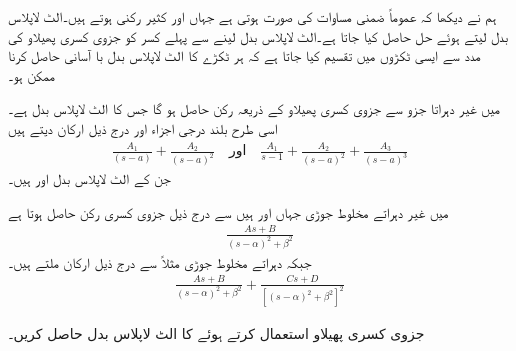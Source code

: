 ہم نے دیکھا کہ عموماً ضمنی مساوات کی صورت  ہوتی ہے جہاں  اور  کثیر رکنی ہوتے ہیں۔الٹ لاپلاس بدل لیتے ہوئے حل  حاصل کیا جاتا ہے۔الٹ لاپلاس بدل لینے سے پہلے کسر کو جزوی کسری پھیلاو کی مدد سے ایسی ٹکڑوں میں تقسیم کیا جاتا ہے کہ ہر ٹکڑے کا الٹ لاپلاس بدل با آسانی حاصل کرنا ممکن ہو۔

 میں غیر دہراتا جزو  سے  جزوی کسری پھیلاو کے ذریعہ  رکن حاصل ہو گا جس کا الٹ لاپلاس بدل  ہے۔اسی طرح بلند درجی اجزاء  اور  درج ذیل ارکان دیتے ہیں
\begin{align*}
\frac{A_1}{(s-a)}+\frac{A_2}{(s-a)^2} \quad \text{اور} \quad \frac{A_1}{s-1}+\frac{A_2}{(s-a)^2}+\frac{A_3}{(s-a)^3}
\end{align*} 
جن کے الٹ لاپلاس بدل  اور  ہیں۔

 میں غیر دہراتے مخلوط جوڑی  جہاں  اور  ہیں سے درج ذیل جزوی کسری رکن حاصل ہوتا ہے
\begin{align*}
\frac{As+B}{(s-\alpha)^2+\beta^2}
\end{align*}
جبکہ دہراتے مخلوط جوڑی مثلاً  سے درج ذیل ارکان ملتے ہیں۔
\begin{align*}
\frac{As+B}{(s-\alpha)^2+\beta^2}+\frac{Cs+D}{[(s-\alpha)^2+\beta^2]^2}
\end{align*}

جزوی کسری پھیلاو استعمال کرتے ہوئے  کا الٹ لاپلاس بدل حاصل کریں۔

